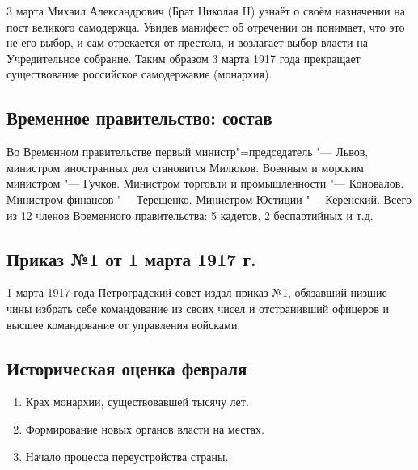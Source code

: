 3 марта Михаил Александрович (Брат Николая II) узнаёт о своём назначении на пост великого самодержца. Увидев манифест об отречении он понимает, что это не его выбор, и сам отрекается от престола, и возлагает выбор власти на Учредительное собрание. Таким образом 3 марта 1917 года прекращает существование российское самодержавие (монархия).

\subsection{Временное правительство: состав}

Во Временном правительстве первый министр"=председатель "--- Львов, министром иностранных дел становится Милюков. Военным и морским министром "--- Гучков. Министром торговли и промышленности "--- Коновалов. Министром финансов "--- Терещенко. Министром Юстиции "--- Керенский. Всего из 12 членов Временного правительства: 5 кадетов, 2 беспартийных и т.д.

\subsection{Приказ №1 от 1 марта 1917 г.}

1 марта 1917 года Петроградский совет издал приказ №1, обязавший низшие чины избрать себе командование из своих чисел и отстранивший офицеров и высшее командование от управления войсками.

\subsection{Историческая оценка февраля}

\begin{enumerate}
    \item Крах монархии, существовавшей тысячу лет.
    \item Формирование новых органов власти на местах.
    \item Начало процесса переустройства страны.
\end{enumerate}
